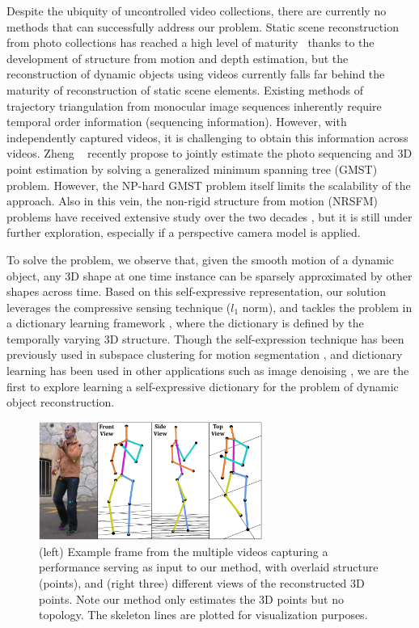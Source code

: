 Despite the ubiquity of uncontrolled video collections, there are currently no methods that can successfully address our problem.
Static scene reconstruction from photo collections has reached a high level of maturity~\cite{Snavely2,zheng2014patchmatch,Heinly} thanks to the development of structure from motion and depth estimation, but the reconstruction of dynamic objects using videos currently falls far behind the maturity of reconstruction of static scene elements. Existing methods of trajectory triangulation \cite{Park_ECCV2010, Valmadre_CVPR2012} from monocular image sequences inherently require temporal order information (sequencing information).
However, with independently captured videos, it is challenging to obtain this  information across videos. Zheng \etal~\cite{zheng2014joint} recently propose to jointly estimate the photo sequencing and 3D point estimation by solving a generalized minimum spanning tree (GMST) problem. However, the NP-hard GMST problem itself limits the scalability of the approach. Also in this vein, the non-rigid structure from motion (NRSFM) problems have received extensive study over the two decades \cite{Tomasi_IJCV92,hartley2008perspective,dai2014simple}, but it is still under further exploration, especially if a perspective camera model is applied. 

To solve the problem, we observe that,
given the smooth motion of a dynamic object, any 3D shape at one time instance can be sparsely approximated by other shapes across time. 
Based on this self-expressive representation, our solution leverages the compressive sensing technique ($l_1$ norm), and tackles the problem in a dictionary learning framework \cite{aharon2006img,elad2006image}, where the dictionary is defined by the temporally varying 3D structure. Though the self-expression technique has been previously used in subspace clustering for motion segmentation \cite{elhamifar2009sparse}, and dictionary learning has been used in other applications such as image denoising \cite{elad2006image}, we are the first to explore learning a self-expressive dictionary for the problem of dynamic object reconstruction. 

\begin{figure}
\centering
\includegraphics[width=0.65\textwidth]{chapter5/resource/first_image_cropped.pdf}
\caption{\label{fig:first_image}(left) Example frame from the multiple videos capturing a performance serving as input to our method, with overlaid structure (points), and (right three) different views of the reconstructed 3D points. Note our method only estimates the 3D points but no topology. The skeleton lines are plotted  for visualization purposes.}
\end{figure} 

